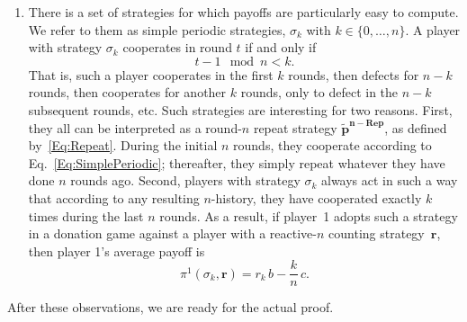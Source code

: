 \documentclass[11pt]{article}
\theoremstyle{plainCl1}
\theoremstyle{plainCl2}
\begin{document}
\begin{enumerate}
\item There is a set of strategies for which payoffs are particularly easy to compute. 
We refer to them as simple periodic strategies, $\sigma_{k}$ with $k\!\in\!\{0,\ldots,n\}$. 
A player with strategy $\sigma_{k}$ cooperates in round $t$ if and only if 
\begin{equation} \label{Eq:SimplePeriodic}
t-1\!\!\mod n < k.
\end{equation}
That is, such a player cooperates in the first $k$ rounds, then defects for $n\!-\!k$ rounds, then cooperates for another $k$ rounds, only to defect in the $n\!-\!k$ subsequent rounds, etc. 
Such strategies are interesting for two reasons. 
First, they all can be interpreted as a round-$n$ repeat strategy $\mathbf{\tilde p^{n-\text{Rep}}}$, as defined by~\eqref{Eq:Repeat}.
During the initial $n$ rounds, they cooperate according to Eq.~\eqref{Eq:SimplePeriodic}; thereafter, they simply repeat whatever they have done $n$ rounds ago. 
Second, players with  strategy $\sigma_{k}$ always act in such a way that according to any resulting $n$-history, they have cooperated exactly $k$ times during the last $n$ rounds. As a result, if player~1 adopts such a strategy in a donation game against a player with a reactive-$n$ counting strategy~$\mathbf{r}$, then player 1's average payoff is 
\begin{equation} \label{Eq:PaySimplePeriodic}
\pi^1(\sigma_{k},\mathbf{r}) = r_k\,b - \frac{k}{n}\,c.
\end{equation}
\end{enumerate}

\noindent
After these observations, we are ready for the actual proof. 
\end{document}
